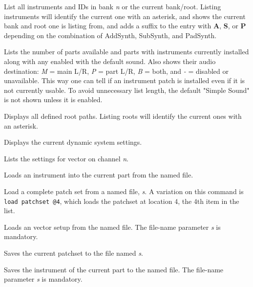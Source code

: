       List all instruments and IDs in bank \textsl{n}
      or the current bank/root.
      Listing instruments will identify the current one with an asterisk, and
      shows the current bank and root one is listing from, and adds a suffix
      to the entry with \textbf{A}, \textbf{S}, or \textbf{P} depending on
      the combination of AddSynth, SubSynth, and PadSynth.

      Lists the number of parts available and parts with instruments
      currently installed along with any enabled with the default sound.
      Also shows their audio destination:
      \textsl{M} = main L/R, \textsl{P} = part L/R, \textsl{B} = both, and
      \textsl{-} = disabled or unavailable.
      This way one can tell if an instrument patch is installed even if it is
      not currently usable.
      To avoid unnecessary list length, the default "Simple Sound" is not
      shown unless it is enabled.

      Displays all defined root paths.
      Listing roots will identify the current ones with an asterisk.

      Displays the current dynamic system settings.

      Lists the settings for vector on channel \textsl{n}.

      Loads an instrument into the current part from the named file.

      Load a complete patch set from a named file, \textsl{s}.
      A variation on this command is \texttt{load patchset @4}, which
      loads the patchset at location 4, the 4th item in the list.

      Loads an vector setup from the named file.
      The file-name parameter \textsl{s} is mandatory.

      Saves the current patchset to the file named \textsl{s}.

      Saves the instrument of the current part to the named file.
      The file-name parameter \textsl{s} is mandatory.

